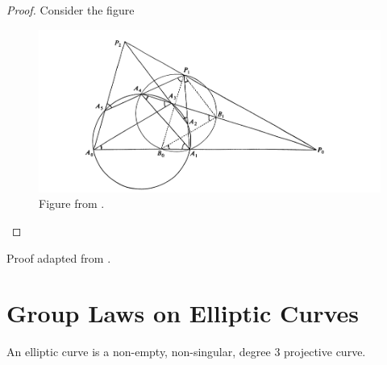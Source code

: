 \begin{proof}
  Consider the figure
  \begin{figure}[H]
   \center
   \includegraphics[width=\linewidth]{pascal.png}
   \caption{Figure from \cite{yzeren}.}
  \end{figure}
\end{proof}

\begin{remark}
  Proof adapted from \cite{yzeren}.
\end{remark}

\section{Group Laws on Elliptic Curves}

\begin{definition}
  An elliptic curve is a non-empty, non-singular, degree 3 projective curve. \cite{spallone}
\end{definition}

